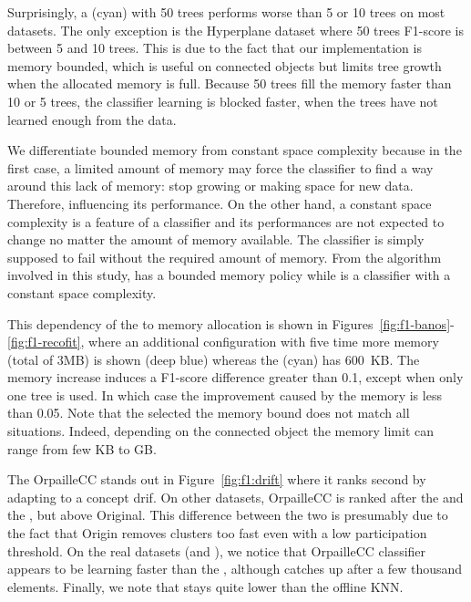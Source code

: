 Surprisingly, a \mondrianforest (cyan) with 50 trees performs worse than 5 or 10
trees on most datasets. The only exception is the Hyperplane dataset where
50 trees F1-score is between 5 and 10 trees. This is due to the fact that
our \mondrianforest implementation is memory bounded, which is
useful on connected objects but limits tree growth when the allocated memory is
full. Because 50 trees fill the memory faster than 10 or 5 trees, the
classifier learning is blocked faster, when the trees have not learned enough
from the data.

We differentiate bounded memory from constant space complexity because in the
first case, a limited amount of memory may force the classifier to find a way
around this lack of memory: stop growing or making space for new data.
Therefore, influencing its performance.  On the other hand, a constant space
complexity is a feature of a classifier and its performances are not expected
to change no  matter the amount of memory available. The classifier is simply
supposed to fail without the required amount of memory. From the algorithm
involved in this study, \mondrianforest has a bounded memory policy while
\naivebayes is a classifier with a constant space complexity.

This dependency of the \mondrianforest to memory allocation is shown in
Figures~\ref{fig:f1-banos}-\ref{fig:f1-recofit}, where an additional
configuration with five time more memory (total of 3MB) is shown (deep blue)
whereas the \mondrianforest (cyan) has 600~KB.  The memory increase induces a
F1-score difference greater than 0.1, except when only one tree is used. In
which case the improvement caused by the memory is less than 0.05. Note that the
selected the memory bound does not match all situations. Indeed, depending on
the connected object the memory limit can range from few KB to GB.

The \mcnn OrpailleCC stands out in Figure~\ref{fig:f1:drift} where it ranks
second by adapting to a concept drif.  On other datasets, \mcnn OrpailleCC is
ranked after the \mondrianforest and the \hoeffdingtree, but above \mcnn
Original. This difference between the two \mcnns is presumably due to the fact
that \mcnn Origin removes clusters too fast even with a low participation
threshold.  On the real datasets (\banosdataset and \recofitdataset), we notice
that \mcnn OrpailleCC classifier appears to be learning faster than the
\mondrianforest, although \mondrianforest catches up after a few thousand
elements. Finally, we note that \mcnn stays quite lower than the offline KNN.


